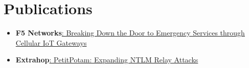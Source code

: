 \documentclass[letterpaper,11pt]{article}
\newcommand{\resumeSubHeadingListStart}{\begin{itemize}[leftmargin=*]}
\newcommand{\resumeSubHeadingListEnd}{\end{itemize}}
\begin{document}
\section{Publications}
  \resumeSubHeadingListStart
    \item{
      \textbf{F5 Networks}{\href{https://www.f5.com/labs/articles/threat-intelligence/breaking-down-the-door-to-emergency-services-through-cellular-io}{: Breaking Down the Door to Emergency Services through Cellular IoT Gateways} }
    }
    \item{
      \textbf{Extrahop}{\href{https://www.extrahop.com/company/blog/2021/petitpotam-and-ntlm-relay-attacks/}{: PetitPotam: Expanding NTLM Relay Attacks} }
    }
  \resumeSubHeadingListEnd
\end{document}
